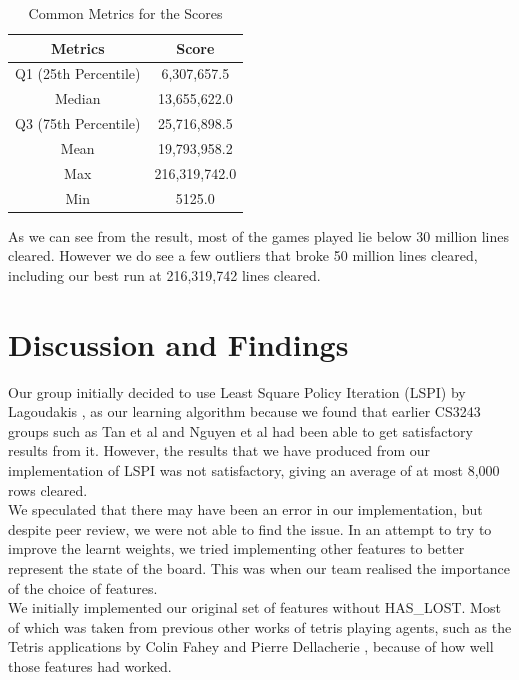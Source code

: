 \documentclass[a4paper,12pt,twocolumn]{article}
\begin{document}
\begin{table}[h]
    \centering
	\begin{tabular}{|c|c|}
		\hline
		\textbf{Metrics}   & \textbf{Score}     \\
		\hline
		Q1 (25th Percentile)  & 6,307,657.5 \\
		\hline
		Median         & 13,655,622.0  \\
		\hline
		Q3 (75th Percentile)      & 25,716,898.5 \\
		\hline
		Mean & 19,793,958.2 \\
		\hline
		Max     & 216,319,742.0  \\
		\hline
		Min          & 5125.0 \\
		\hline
	\end{tabular}
	\caption{Common Metrics for the Scores}
	\label{metric_scores}
\end{table}

As we can see from the result, most of the games played lie below 30 million lines
cleared. However we do see a few outliers that broke 50 million lines cleared, including
our best run at 216,319,742 lines cleared.

\section{Discussion and Findings}
\label{discussion_n_findings}
Our group initially decided to use Least Square Policy Iteration (LSPI) by Lagoudakis \cite{lagoudakis},
as our learning algorithm because we found that earlier CS3243 groups such as
Tan et al \cite{shawntan} and Nguyen et al \cite{nhannguyen} had been able to get
satisfactory results from it. However, the results that we have produced from our
implementation of LSPI was not satisfactory, giving an average of at most 8,000 rows
cleared.\\

We speculated that there may have been an error in our implementation, but despite
peer review, we were not able to find the issue. In an attempt to try to improve the
learnt weights, we tried implementing other features to better represent the state
of the board. This was when our team realised the importance of the choice of features.\\

We initially implemented our original set of features without HAS\_LOST. Most of which
was taken from previous other works of tetris playing agents, such as the Tetris
applications by Colin Fahey and Pierre Dellacherie \cite{colin_fahey}, because of
how well those features had worked.\\
\end{document}
